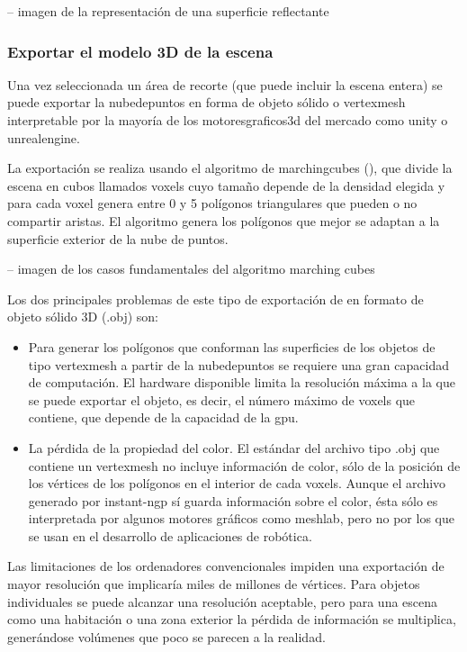 \documentclass[a4paper, 12pt, spanish, twoside]{article}
\begin{document}
-- imagen de la representación de una superficie reflectante 

\subsubsection{Exportar el modelo 3D de la escena} \label{sec:implementacion:instant-ngp:exportar}

Una vez seleccionada un área de recorte (que puede incluir la escena entera) se puede exportar la \gls{nubedepuntos} en forma de objeto sólido o \gls{vertexmesh} interpretable por la mayoría de los \gls{motoresgraficos3d} del mercado como \gls{unity} o \gls{unrealengine}. 

La exportación se realiza usando el algoritmo de \gls{marchingcubes} (\cite{lorensen-cline:marchingcubes}), que divide la escena en cubos llamados \glspl{voxel} cuyo tamaño depende de la densidad elegida y para cada \gls{voxel} genera entre 0 y 5 polígonos triangulares que pueden o no compartir aristas. El algoritmo genera los polígonos que mejor se adaptan a la superficie exterior de la nube de puntos. 

-- imagen de los casos fundamentales del algoritmo marching cubes 

Los dos principales problemas de este tipo de exportación de en formato de objeto sólido 3D (.obj) son: 

\begin{itemize} 

\item Para generar los polígonos que conforman las superficies de los objetos de tipo \gls{vertexmesh} a partir de la \gls{nubedepuntos} se requiere una gran capacidad de computación. El \gls{hardware} disponible limita la resolución máxima a la que se puede exportar el objeto, es decir, el número máximo de \glspl{voxel} que contiene, que depende de la capacidad de la \acrshort{gpu}. 
\item La pérdida de la propiedad del color. El estándar del archivo tipo .obj que contiene un \gls{vertexmesh} no incluye información de color, sólo de la posición de los vértices de los polígonos en el interior de cada \glspl{voxel}. Aunque el archivo generado por \gls{instant-ngp} sí guarda información sobre el color, ésta sólo es interpretada por algunos motores gráficos como \gls{meshlab}, pero no por los que se usan en el desarrollo de aplicaciones de robótica. 

\end{itemize} 

Las limitaciones de los ordenadores convencionales impiden una exportación de mayor resolución que implicaría miles de millones de vértices. Para objetos individuales se puede alcanzar una resolución aceptable, pero para una escena como una habitación o una zona exterior la pérdida de información se multiplica, generándose volúmenes que poco se parecen a la realidad. 
\end{document}
